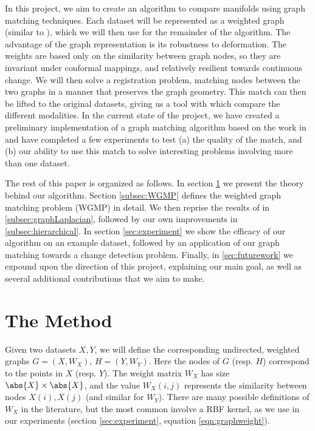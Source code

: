 \documentclass{article}[11pt]
\begin{document}
In this project, we aim to create an algorithm to compare manifolds using graph
matching techniques. Each dataset will be represented as a weighted graph
(similar to \cite{Wang:2013:MAP:2540128.2540378, Tuia2016}), which we will then
use for the remainder of the algorithm. The advantage of the graph
representation is its robustness to deformation. The weights are based only on
the similarity between graph nodes, so they are invariant under conformal
mappings, and relatively resilient towards continuous change. We will then solve
a registration problem, matching nodes between the two graphs in a manner that
preserves the graph geometry. This match can then be lifted to the original
datasets, giving us a tool with which compare the different modalities. In the
current state of the project, we have created a preliminary implementation of a
graph matching algorithm based on the work in \cite{Umeyama1988,Knossow2009} and
have completed a few experiments to test (a) the quality of the match, and (b)
our ability to use this match to solve interesting problems involving more than
one dataset.

The rest of this paper is organized as follows. In section \ref{sec:method} we
present the theory behind our algorithm. Section \ref{subsec:WGMP} defines the
weighted graph matching problem (WGMP) in detail. We then reprise the results of
\cite{Umeyama1988,Knossow2009} in \ref{subsec:graphLaplacian}, followed by our
own improvements in \ref{subsec:hierarchical}. In section \ref{sec:experiment}
we show the efficacy of our algorithm on an example dataset, followed by an
application of our graph matching towards a change detection problem. Finally,
in \ref{sec:futurework} we expound upon the direction of this project,
explaining our main goal, as well as several additional contributions that we
aim to make.

%
\section{The Method}
\label{sec:method}
Given two datasets $X,Y$, we will define the corresponding undirected, weighted
graphs $G = (X,W_X)$, $H = (Y,W_Y)$. Here the nodes of $G$ (resp. $H$)
correspond to the points in $X$ (resp. $Y$). The weight matrix $W_X$ has size
$\abs{X}\times\abs{X}$, and the value $W_X(i,j)$ represents the similarity
between nodes $X(i),X(j)$ (and similar for $W_Y$). There are many possible
definitions of $W_X$ in the literature, but the most common involve a RBF
kernel, as we use in our experiments (section \ref{sec:experiment}, equation
\ref{eqn:graphweight}).
\end{document}
